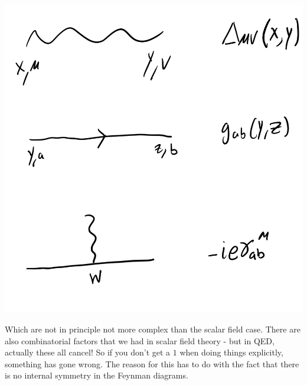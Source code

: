 \begin{center}
    \includegraphics[scale=0.5]{Images/fig-lec31p1.png}
\end{center}

Which are not in principle not more complex than the scalar field case. There are also combinatorial factors that we had in scalar field theory - but in QED, actually these all cancel! So if you don't get a $1$ when doing things explicitly, something has gone wrong. The reason for this has to do with the fact that there is no internal symmetry in the Feynman diagrams.

